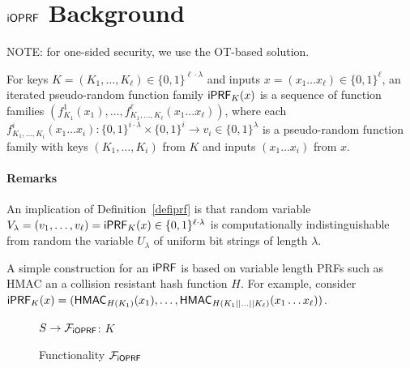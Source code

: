 \section{$\mathsf{i}\mathsf{OPRF}$ Background}
NOTE: for one-sided security, we use the OT-based solution.




\begin{definition}[$\iprf$]\label{defiprf}
  For keys $K=(K_1,\ldots,K_\ell)\in\{0,1\}^{\ell\cdot\lambda}$ and
  inputs $x=(x_1\ldots{}x_\ell)\in\{0,1\}^\ell$, an iterated
  pseudo-random function family $\mathsf{i}\mathsf{PRF}_{K}(x)$ is a sequence of
  function families
  $(f^1_{K_1}(x_{1}),\ldots,f^\ell_{K_1,\ldots,K_\ell}(x_{1}\ldots{}x_{\ell}))$,
  where each
  $f^i_{K_1,\ldots,K_i}(x_{1}\ldots{}x_{i}):\{0,1\}^{i\cdot\lambda}\times\{0,1\}^{i}\rightarrow{}v_i\in\{0,1\}^\lambda$
  is a pseudo-random function family with keys $(K_1,\ldots,K_i)$ from $K$ and
  inputs $(x_1\ldots{}x_i)$ from $x$.
\end{definition}

\paragraph{Remarks}
An implication of Definition~\ref{defiprf} is that random variable
$V_\lambda=(v_1,\ldots,v_\ell)=\mathsf{i}\mathsf{PRF}_K(x)\in\{0,1\}^{\ell\cdot\lambda}$
is computationally indistinguishable from random the variable
$U_\lambda$ of uniform bit strings of length $\lambda$.

A simple construction for an $\iprf$ is based on
variable length PRFs such as HMAC an a collision resistant hash
function $H$. For example, consider
$\mathsf{i}\mathsf{PRF}_K(x)=(\mathsf{HMAC}_{H(K_1)}(x_1),\ldots,\mathsf{HMAC}_{H(K_1||\ldots||K_\ell)}(x_1\ldots{}x_\ell))$.


\begin{figure}[tb]
\LinesNumbered
\begin{functionality}[H]
$S\rightarrow{}\mathcal{F}_{\mathsf{i}\mathsf{OPRF}}$: $K$\;
\end{functionality}
\caption{Functionality $\mathcal{F}_{\mathsf{i}\mathsf{OPRF}}$\label{idealioprf}}
\end{figure}

